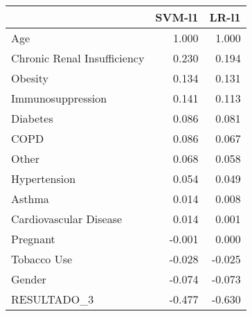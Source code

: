 \begin{tabular}{lrr}
\toprule
{} &  SVM-l1 &  LR-l1 \\
\midrule
Age                         &   1.000 &  1.000 \\
Chronic Renal Insufficiency &   0.230 &  0.194 \\
Obesity                     &   0.134 &  0.131 \\
Immunosuppression           &   0.141 &  0.113 \\
Diabetes                    &   0.086 &  0.081 \\
COPD                        &   0.086 &  0.067 \\
Other                       &   0.068 &  0.058 \\
Hypertension                &   0.054 &  0.049 \\
Asthma                      &   0.014 &  0.008 \\
Cardiovascular Disease      &   0.014 &  0.001 \\
Pregnant                    &  -0.001 &  0.000 \\
Tobacco Use                 &  -0.028 & -0.025 \\
Gender                      &  -0.074 & -0.073 \\
RESULTADO\_3                 &  -0.477 & -0.630 \\
\bottomrule
\end{tabular}
